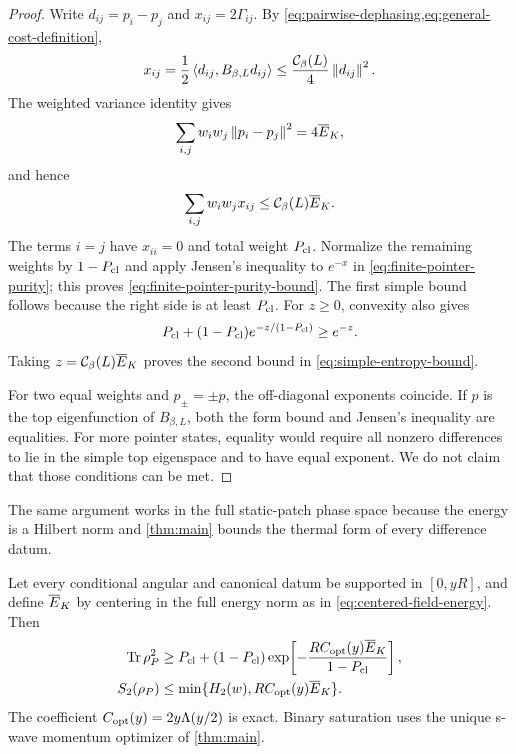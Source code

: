 \begin{proof}
Write $d_{ij}=p_i-p_j$ and $x_{ij}=2\Gamma_{ij}$.  By
\cref{eq:pairwise-dephasing,eq:general-cost-definition},
\begin{equation}
 x_{ij}=\frac12\left\langle d_{ij},B_{\beta,L}d_{ij}\right\rangle
 \leq\frac{\mathcal C_\beta(L)}4\left\lVert d_{ij}\right\rVert^2.
 \label{eq:pairwise-exponent-bound}
\end{equation}
The weighted variance identity gives
\begin{equation}
 \sum_{i,j}w_iw_j\left\lVert p_i-p_j\right\rVert^2=4\overline E_{K},
 \label{eq:pairwise-variance-identity}
\end{equation}
and hence
\begin{equation}
 \sum_{i,j}w_iw_jx_{ij}\leq\mathcal C_\beta(L)\overline E_{K}.
 \label{eq:average-exponent-bound}
\end{equation}
The terms $i=j$ have $x_{ii}=0$ and total weight $P_{\rm cl}$.  Normalize the
remaining weights by $1-P_{\rm cl}$ and apply Jensen's inequality to $e^{-x}$ in
\cref{eq:finite-pointer-purity}; this proves
\cref{eq:finite-pointer-purity-bound}.  The first simple bound follows because
the right side is at least $P_{\rm cl}$.  For $z\geq0$, convexity also gives
\begin{equation}
 P_{\rm cl}+(1-P_{\rm cl})e^{-z/(1-P_{\rm cl})}\geq e^{-z}.
\end{equation}
Taking $z=\mathcal C_\beta(L)\overline E_{K}$ proves the second bound in
\cref{eq:simple-entropy-bound}.

For two equal weights and $p_\pm=\pm p$, the off-diagonal exponents coincide.
If $p$ is the top eigenfunction of $B_{\beta,L}$, both the form bound and
Jensen's inequality are equalities.  For more pointer states, equality would
require all nonzero differences to lie in the simple top eigenspace and to
have equal exponent.  We do not claim that those conditions can be met.
\end{proof}

The same argument works in the full static-patch phase space because the
energy is a Hilbert norm and \cref{thm:main} bounds the thermal form of every
difference datum.

\begin{corollary}
\label{cor:de-sitter-finite-pointer}
Let every conditional angular and canonical datum be supported in $[0,yR]$,
and define $\overline E_{K}$ by centering in the full energy norm as in
\cref{eq:centered-field-energy}.  Then
\begin{align}
 \operatorname{Tr}\rho_P^2
 &\geq P_{\rm cl}+(1-P_{\rm cl})
 \exp\!\left[-\frac{R C_{\rm opt}(y)\overline E_{K}}{1-P_{\rm cl}}\right],
 \label{eq:de-sitter-pointer-purity}\\
 S_2(\rho_P)&\leq\min\{H_2(w),R C_{\rm opt}(y)\overline E_{K}\}.
 \label{eq:de-sitter-pointer-entropy}
\end{align}
The coefficient $C_{\rm opt}(y)=2y\Lambda(y/2)$ is exact.  Binary saturation
uses the unique s-wave momentum optimizer of \cref{thm:main}.
\end{corollary}


